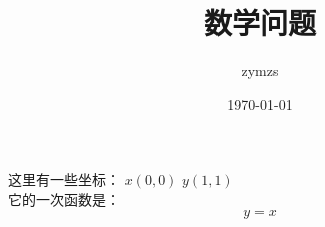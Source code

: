 \documentclass{ctexart}
\title{数学问题}
\author{zymzs}
\date{\today}
\begin{document}
	\maketitle
	这里有一些坐标： $ x(0, 0) $ $ y(1, 1) $ \\
	它的一次函数是： 
	\begin{equation}	
		y=x
	\end{equation}
\end{document}
